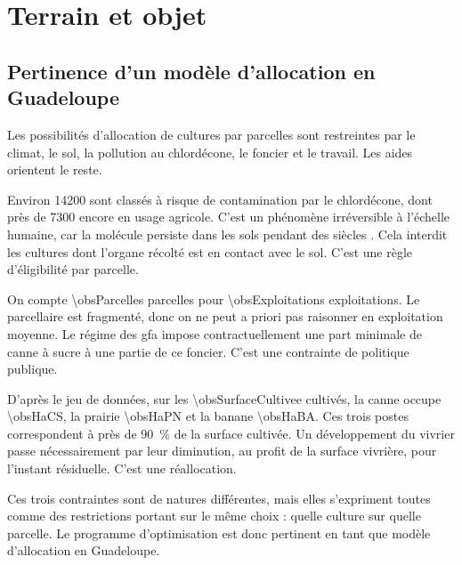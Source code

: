 \chapter{Terrain et objet}
\label{ch:terrain}


\section{Pertinence d'un modèle d'allocation en Guadeloupe}
\label{sec:territoire}

Les possibilités d'allocation de cultures par parcelles sont restreintes par le climat, le sol,
la pollution au chlordécone, le foncier et le travail. Les aides orientent le reste.

Environ \SI{14200}{\ha} sont classés à risque de contamination par le chlordécone, dont près de
\SI{7300}{\ha} encore en usage agricole. C'est un phénomène irréversible à l'échelle humaine, car
la molécule persiste dans les sols pendant des siècles \parencite{daafchlordecone}. Cela interdit
les cultures dont l'organe récolté est en contact avec le sol. C'est une règle d'éligibilité par
parcelle.

On compte \num{\obsParcelles} parcelles pour \num{\obsExploitations} exploitations. Le
parcellaire est fragmenté, donc on ne peut a priori pas raisonner en exploitation moyenne. Le
régime des \gls{gfa} impose contractuellement une part minimale de canne à sucre à une partie de
ce foncier. C'est une contrainte de politique publique.

D'après le jeu de données, sur les \SI{\obsSurfaceCultivee}{\ha} cultivés, la canne occupe
\SI{\obsHaCS}{\ha}, la prairie \SI{\obsHaPN}{\ha} et la banane \SI{\obsHaBA}{\ha}. Ces trois
postes correspondent à près de \SI{90}{\percent} de la surface cultivée. Un développement du
vivrier passe nécessairement par leur diminution, au profit de la surface vivrière, pour
l'instant résiduelle. C'est une réallocation.

Ces trois contraintes sont de natures différentes, mais elles s'expriment toutes comme des
restrictions portant sur le même choix : quelle culture sur quelle parcelle. Le programme
d'optimisation est donc pertinent en tant que modèle d'allocation en Guadeloupe.

